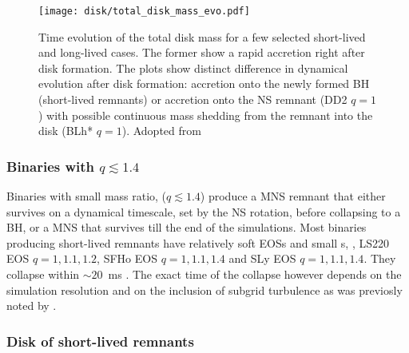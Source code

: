 \begin{figure}[t]
    \centering 
    \texttt{[image: disk/total\_disk\_mass\_evo.pdf]}
    \caption{Time evolution of the total disk mass for a few selected
        short-lived and long-lived cases. The former show a rapid 
        accretion right after disk formation. The plots show
        distinct difference in dynamical evolution after disk formation: accretion onto
        the newly formed BH (short-lived remnants) or accretion onto the NS
        remnant (DD2 $q=1$) with possible continuous mass shedding from the remnant
        into the disk (BLh* $q=1$). Adopted from \citet{Nedora:2020pak}
    } 
    \label{fig:disk_mass_evo}
\end{figure}


\subsubsection*{Binaries with $q\lesssim1.4$}

Binaries with small mass ratio, ($q\lesssim1.4$) produce a \ac{MNS} remnant
that either survives on a dynamical timescale, set by the \ac{NS} rotation, before
collapsing to a \ac{BH}, or a \ac{MNS} that survives till the end of the simulations.
%
Most binaries producing short-lived remnants have relatively soft \acp{EOS}
and small \mr{}s, \eg, LS220 \ac{EOS} $q=1,1.1,1.2$, SFHo \ac{EOS} $q=1,1.1,1.4$ 
and SLy \ac{EOS} $q=1,1.1,1.4$. They collapse within $\sim20$~ms \pmerg. 
The exact time of the collapse however depends on the simulation resolution 
and on the inclusion of subgrid turbulence as was previosly noted by \citet{Radice:2017zta}.


\subsubsection*{Disk of short-lived remnants}

